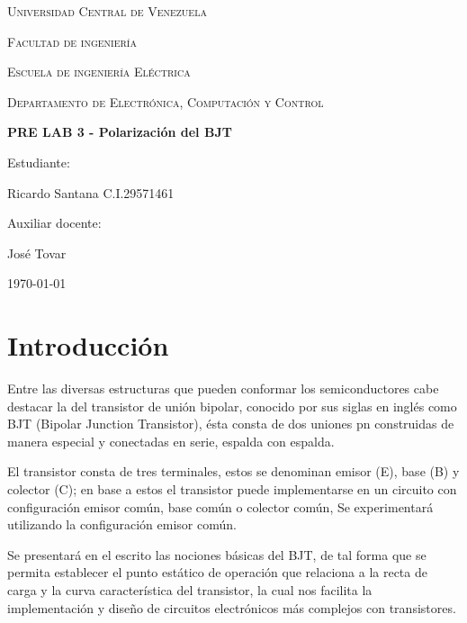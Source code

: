 \documentclass[10pt, a4paper]{article}
\begin{document}
    \begin{titlepage}
        \centering
        {\scshape\Large Universidad Central de Venezuela \par}
        {\scshape\Large Facultad de ingenier\'ia \par}
        {\scshape\Large Escuela de ingenier\'ia El\'ectrica \par}
        {\scshape\Large Departamento de Electr\'onica, Computaci\'on y Control \par}

        \vspace{6cm}
        {\Large\bfseries PRE LAB 3 - Polarización del BJT\par}
        \vspace{5cm}

        \vfill
        \begin{flushright}
            Estudiante:\par
            Ricardo Santana C.I.29571461 \par
            \vspace{1cm}
            Auxiliar docente:\par
            José Tovar  
        \end{flushright}
        \vfill
        {\large \today\par}
    \end{titlepage}

    \section{Introducción}

    Entre las diversas estructuras que pueden conformar los semiconductores cabe destacar la del transistor de unión bipolar, conocido por sus siglas en inglés como BJT (Bipolar Junction Transistor), ésta consta de dos uniones pn construidas de manera especial y conectadas en serie, espalda con espalda.

    El transistor consta de tres terminales, estos se denominan emisor (E), base (B) y colector (C); en base a estos el transistor puede implementarse en un circuito con configuración emisor común, base común o colector común, Se experimentará utilizando la configuración emisor común.
    
    Se presentará en el escrito las nociones básicas del BJT, de tal forma que se permita establecer el punto estático de operación que relaciona a la recta de carga y la curva característica del transistor, la cual nos facilita la implementación y diseño de circuitos electrónicos más complejos con transistores.
\end{document}
